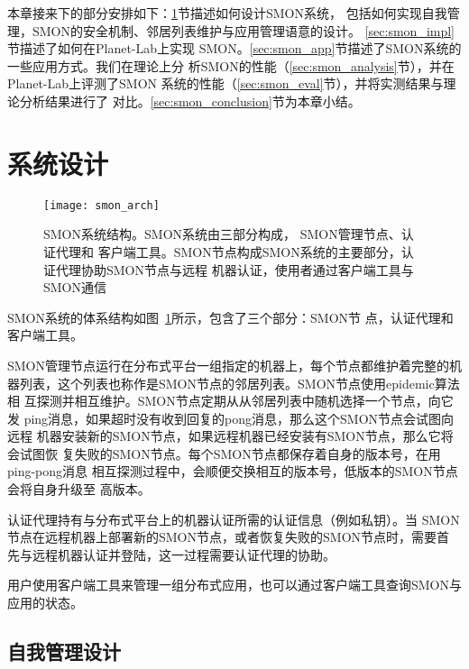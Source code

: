 
本章接来下的部分安排如下：\ref{sec:smon_design}节描述如何设计SMON系统，
包括如何实现自我管理，SMON的安全机制、邻居列表维护与应用管理语意的设计。
\ref{sec:smon_impl}节描述了如何在Planet-Lab上实现
SMON。\ref{sec:smon_app}节描述了SMON系统的一些应用方式。我们在理论上分
析SMON的性能（\ref{sec:smon_analysis}节），并在Planet-Lab上评测了SMON
系统的性能（\ref{sec:smon_eval}节），并将实测结果与理论分析结果进行了
对比。\ref{sec:smon_conclusion}节为本章小结。

\section{系统设计}
\label{sec:smon_design}

\begin{figure}
  \centering
  \begin{minipage}{0.8\linewidth}
    \centering
    \texttt{[image: smon\_arch]}
    \caption[SMON系统结构]{SMON系统结构。SMON系统由三部分构成，
    SMON管理节点、认证代理和
    客户端工具。SMON节点构成SMON系统的主要部分，认证代理协助SMON节点与远程
    机器认证，使用者通过客户端工具与SMON通信}
    \label{fig:smon_arch}
  \end{minipage}
\end{figure}

SMON系统的体系结构如图~\ref{fig:smon_arch}所示，包含了三个部分：SMON节
点，认证代理和客户端工具。

SMON管理节点运行在分布式平台一组指定的机器上，每个节点都维护着完整的机
器列表，这个列表也称作是SMON节点的邻居列表。SMON节点使用epidemic算法相
互探测并相互维护。SMON节点定期从从邻居列表中随机选择一个节点，向它发
ping消息，如果超时没有收到回复的pong消息，那么这个SMON节点会试图向远程
机器安装新的SMON节点，如果远程机器已经安装有SMON节点，那么它将会试图恢
复失败的SMON节点。每个SMON节点都保存着自身的版本号，在用ping-pong消息
相互探测过程中，会顺便交换相互的版本号，低版本的SMON节点会将自身升级至
高版本。

认证代理持有与分布式平台上的机器认证所需的认证信息（例如私钥）。当
SMON节点在远程机器上部署新的SMON节点，或者恢复失败的SMON节点时，需要首
先与远程机器认证并登陆，这一过程需要认证代理的协助。

用户使用客户端工具来管理一组分布式应用，也可以通过客户端工具查询SMON与
应用的状态。

\subsection{自我管理设计}


